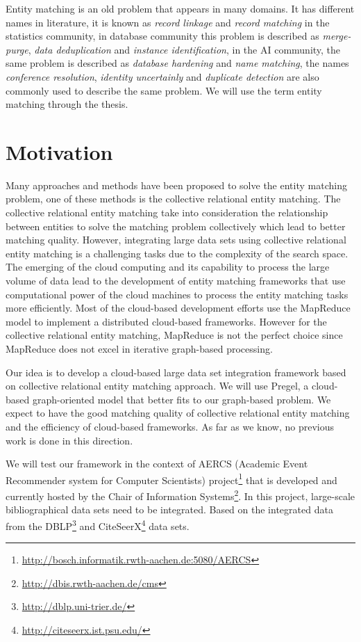 Entity matching is an old problem that appears in many domains. It has different names in literature, it is known as \textit{record linkage} and \textit{record matching} in the statistics community, in database community this problem is described as \textit{merge-purge}, \textit{data deduplication} and \textit{instance identification}, in the AI community, the same problem is described as \textit{database hardening} and \textit{name matching}, the names \textit{conference resolution}, \textit{identity uncertainly} and \textit{duplicate detection} are also commonly used to describe the same problem. We will use the term entity matching through the thesis.


\section {Motivation}
Many approaches and methods have been proposed to solve the entity matching problem, one of these methods is the collective relational entity matching. The collective relational entity matching take into consideration the relationship between entities to solve the matching problem collectively which lead to better matching quality.
However, integrating large data sets using collective relational entity matching is a challenging tasks due to the complexity of the search space. The  emerging of the cloud computing and its capability to process the large volume of data lead to the development of entity matching frameworks that use computational power of the cloud machines to process the entity matching tasks more efficiently. Most of the cloud-based development efforts use the MapReduce model to implement a distributed cloud-based frameworks. However for the collective relational entity matching, MapReduce is not the perfect choice since MapReduce does not excel in iterative graph-based processing.

Our idea is to develop a cloud-based large data set integration framework based on collective relational entity matching approach. We will use Pregel, a cloud-based graph-oriented model that better fits to our graph-based problem. We expect to have the good matching quality of collective relational entity matching and the efficiency of cloud-based frameworks. As far as we know, no previous work is done in this direction. 
 
We will test our framework in the context of AERCS (Academic Event Recommender system for Computer Scientists) project\footnote{\url{http://bosch.informatik.rwth-aachen.de:5080/AERCS}} that is developed and currently hosted by the Chair of Information Systems\footnote{\url{http://dbis.rwth-aachen.de/cms}}. In this project, large-scale bibliographical data sets need to be integrated. Based on the integrated data from the DBLP\footnote{\url{http://dblp.uni-trier.de/}} and CiteSeerX\footnote{\url{http://citeseerx.ist.psu.edu/}} data sets.

